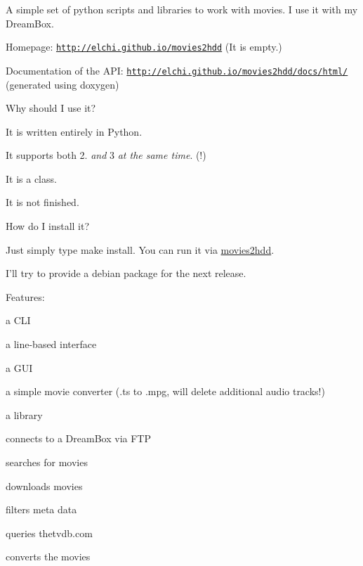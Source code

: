 A simple set of python scripts and libraries to work with movies. I use it with my Dream\-Box.
\begin{DoxyItemize}
\item Homepage\-: \href{http://elchi.github.io/movies2hdd}{\tt http\-://elchi.\-github.\-io/movies2hdd} (It is empty.)
\item Documentation of the A\-P\-I\-: \href{http://elchi.github.io/movies2hdd/docs/html/}{\tt http\-://elchi.\-github.\-io/movies2hdd/docs/html/} (generated using doxygen) 


\end{DoxyItemize}

Why should I use it?
\begin{DoxyItemize}
\item It is written entirely in Python.
\item It supports both 2. {\itshape and} 3 {\itshape at the same time}. (!)
\item It is a class.
\item It is not finished. 


\end{DoxyItemize}

How do I install it?

Just simply type {\ttfamily make install}. You can run it via {\ttfamily \hyperlink{namespacemovies2hdd}{movies2hdd}}.

I'll try to provide a debian package for the next release. 



Features\-:
\begin{DoxyItemize}
\item a C\-L\-I
\begin{DoxyItemize}
\item a line-\/based interface
\item a G\-U\-I
\item a simple movie converter (.ts to .mpg, will delete additional audio tracks!)
\end{DoxyItemize}
\item a library
\begin{DoxyItemize}
\item connects to a Dream\-Box via F\-T\-P
\item searches for movies
\item downloads movies
\item filters meta data
\item queries thetvdb.\-com
\item converts the movies 
\end{DoxyItemize}
\end{DoxyItemize}